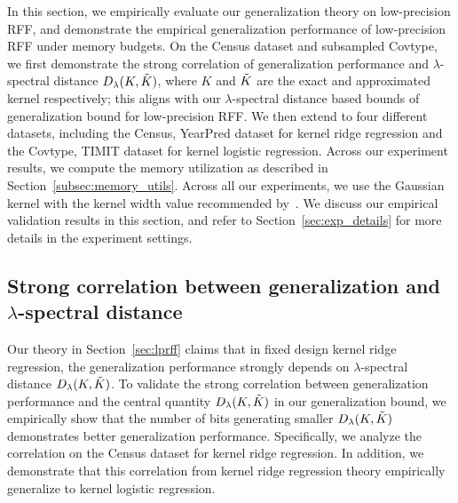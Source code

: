 In this section, we empirically evaluate our generalization theory on low-precision RFF, and demonstrate the empirical generalization performance of low-precision RFF under memory budgets. On the Census dataset and subsampled Covtype, we first demonstrate the strong correlation of generalization performance and $\lambda$-spectral distance $D_{\lambda}(K,\tilde{K})$, where $K$ and $\tilde{K}$ are the exact and approximated kernel respectively; this aligns with our $\lambda$-spectral distance based bounds of generalization bound for low-precision RFF. We then extend to four different datasets, including the Census, YearPred dataset for kernel ridge regression and the Covtype, TIMIT dataset for kernel logistic regression. Across our experiment results, we compute the memory utilization as described in Section~\ref{subsec:memory_utils}. Across all our experiments, we use the Gaussian kernel with the kernel width value recommended by~\citet{may2017}. We discuss our empirical validation results in this section, and refer to Section~\ref{sec:exp_details} for more details in the experiment settings.

\subsection{Strong correlation between generalization and $\lambda$-spectral distance}
Our theory in Section~\ref{sec:lprff} claims that in fixed design kernel ridge regression, the generalization performance strongly depends on $\lambda$-spectral distance $D_{\lambda}(K,\tilde{K})$.
To validate the strong correlation between generalization performance and the central quantity $D_{\lambda}(K,\tilde{K})$ in our generalization bound, we empirically show that the number of bits generating smaller $D_{\lambda}(K,\tilde{K})$ demonstrates better generalization performance. 
Specifically, we analyze the correlation on the Census dataset for kernel ridge regression. In addition, we demonstrate that this correlation from kernel ridge regression theory empirically generalize to kernel logistic regression. 

